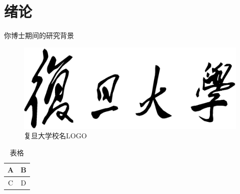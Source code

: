 \chapter{绪论}

你博士期间的研究背景

\begin{figure}
	\centering
	\includegraphics[width=1\linewidth]{IMAGES/xiaoming.eps}
	\caption{复旦大学校名LOGO}
\end{figure}

\begin{table}
	\centering
	\begin{tabular}{c|c}
	A & B \\ \hline
	C & D \\
	\end{tabular}
	\caption{表格}
\end{table}
